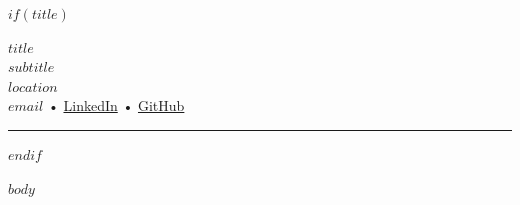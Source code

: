 \documentclass[11pt,a4paper]{article}
\newcommand{\makeheader}[5]{
  \begin{center}
    {\Huge \textbf{#1}}\\[4pt]
    {\large \textcolor{textgray}{#2}}\\[6pt]
    #3 \\ %
    \href{mailto:#4}{#4} • \href{#5}{LinkedIn} • \href{https://github.com/#1}{GitHub}\\[1em]
  \end{center}
  \vspace{0.5em}
  \hrule
  \vspace{1em}
}
\begin{document}
$if(title)$
\makeheader{$title$}{$subtitle$}{$location$}{$email$}{$linkedin$}
$endif$

\color{textgray}
$body$
\end{document}
